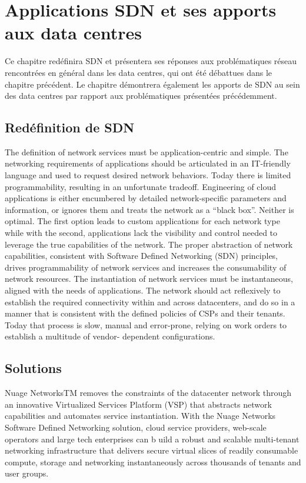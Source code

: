 
\chapter{Applications SDN et ses apports aux data centres}

Ce chapitre redéfinira SDN et présentera ses réponses aux problématiques réseau rencontrées en général dans les data centres, qui ont été débattues dans le chapitre précédent. %
Le chapitre démontrera également les apports de SDN au sein des data centres par rapport aux problématiques présentées précédemment.

\section{Redéfinition de SDN}

The definition of network services must be application-centric and simple. The networking requirements of applications should be articulated in an IT-friendly language and used to request desired network behaviors. Today there is limited programmability, resulting in an unfortunate tradeoff. Engineering of cloud applications is either encumbered by detailed network-specific parameters and information, or ignores them and treats the network as a “black box”. Neither is optimal. The first option leads to custom applications for each network type while with the second, applications lack the visibility and control needed to leverage the true capabilities of the network.
The proper abstraction of network capabilities, consistent with Software Defined Networking (SDN) principles, drives programmability of network services and increases the consumability of network resources.
The instantiation of network services must be instantaneous, aligned with the needs of applications. The network should act reflexively to establish the required connectivity within and across datacenters, and do so in a manner that is consistent with the defined policies of CSPs and their tenants. Today that process is slow, manual and error-prone, relying on work orders to establish a multitude of vendor- dependent configurations.

\section{Solutions}

Nuage NetworksTM removes the constraints of the datacenter network through an innovative Virtualized Services Platform (VSP) that abstracts network capabilities and automates service instantiation. With the Nuage Networks Software Defined Networking solution, cloud service providers, web-scale operators and large tech enterprises can b uild a robust and scalable multi-tenant networking infrastructure that delivers secure virtual slices of readily consumable compute, storage and networking instantaneously across thousands of tenants and user groups.

